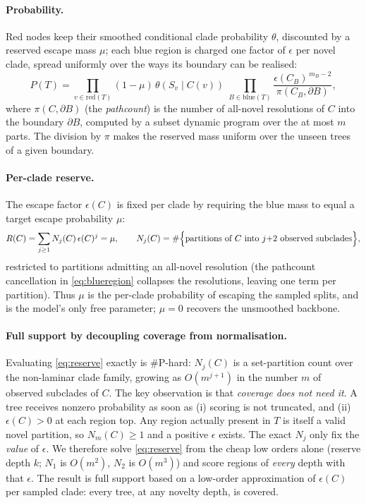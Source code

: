 \documentclass{article}
\begin{document}
\paragraph{Probability.}
Red nodes keep their smoothed conditional clade probability $\theta$, discounted
by a reserved escape mass $\mu$; each blue region is charged one factor of
$\epsilon$ per novel clade, spread uniformly over the ways its boundary can be
realised:
\begin{equation}
  P(T)=\prod_{v\in\mathrm{red}(T)}\!(1-\mu)\,\theta\!\left(S_v\mid C(v)\right)
       \;\prod_{B\in\mathrm{blue}(T)}\!\frac{\epsilon(C_B)^{\,m_B-2}}{\pi(C_B,\partial B)},
  \label{eq:blueregion}
\end{equation}
where $\pi(C,\partial B)$ (the \emph{pathcount}) is the number of all-novel
resolutions of $C$ into the boundary $\partial B$, computed by a subset
dynamic program over the at most $m$ parts. The division by $\pi$ makes the
reserved mass uniform over the unseen trees of a given boundary.

\paragraph{Per-clade reserve.}
The escape factor $\epsilon(C)$ is fixed per clade by requiring the blue mass to
equal a target escape probability $\mu$:
\begin{equation}
  R(C)=\sum_{j\ge 1} N_j(C)\,\epsilon(C)^{j}=\mu,
  \qquad
  N_j(C)=\#\Bigl\{\text{partitions of $C$ into $j{+}2$ observed subclades}\Bigr\},
  \label{eq:reserve}
\end{equation}
restricted to partitions admitting an all-novel resolution (the pathcount
cancellation in \eqref{eq:blueregion} collapses the resolutions, leaving one term
per partition). Thus $\mu$ is the per-clade probability of escaping the sampled
splits, and is the model's only free parameter; $\mu=0$ recovers the unsmoothed
backbone.

\paragraph{Full support by decoupling coverage from normalisation.}
Evaluating \eqref{eq:reserve} exactly is \#P-hard: $N_j(C)$ is a set-partition
count over the non-laminar clade family, growing as $O(m^{j+1})$ in the number $m$
of observed subclades of $C$. The key observation is that \emph{coverage does not
need it}. A tree receives nonzero probability as soon as (i) scoring is not
truncated, and (ii) $\epsilon(C)>0$ at each region top. Any region actually
present in $T$ is itself a valid novel partition, so $N_m(C)\ge 1$ and a positive
$\epsilon$ exists. The exact $N_j$ only fix the \emph{value} of $\epsilon$. We
therefore solve \eqref{eq:reserve} from the cheap low orders alone (reserve depth
$k$; $N_1$ is $O(m^2)$, $N_2$ is $O(m^3)$) and score regions of \emph{every}
depth with that $\epsilon$. The result is full support based on a low-order approximation of $\epsilon(C)$ per sampled clade: every tree, at any novelty depth, is covered.
\end{document}

